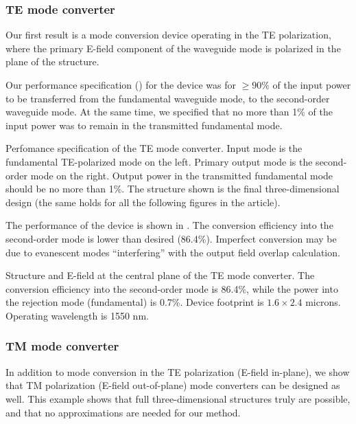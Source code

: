 \subsubsection{TE mode converter}
Our first result is a mode conversion device operating in the TE polarization,
    where the primary E-field component
    of the waveguide mode is polarized in the plane of the structure.

Our performance specification () 
    for the device was for $\ge90\%$ of the 
    input power to be transferred from the fundamental waveguide mode,
    to the second-order waveguide mode.
At the same time, we specified that no more than 1\% of the input power
    was to remain in the transmitted fundamental mode.

    {Perfomance specification of the TE mode converter.
    Input mode is the fundamental TE-polarized mode on the left.
    Primary output mode is the second-order mode on the right.
    Output power in the transmitted fundamental mode 
    should be no more than 1\%.
    The structure shown is the final three-dimensional design
    (the same holds for all the following figures in the article).
    }

The performance of the device is shown in .
The conversion efficiency into the second-order mode is lower
    than desired (86.4\%). 
Imperfect conversion may be due to evanescent modes ``interfering'' 
    with the output field overlap calculation.

    {Structure and E-field at the central plane of the TE mode converter.
    The conversion efficiency into the second-order mode is 86.4\%,
    while the power into the rejection mode (fundamental) is 0.7\%.
    Device footprint is $1.6\times2.4$ microns.
    Operating wavelength is 1550 nm.}


\subsubsection{TM mode converter}

In addition to mode conversion in the TE polarization (E-field in-plane),
    we show that TM polarization (E-field out-of-plane) mode converters
    can be designed as well.
This example shows that full three-dimensional structures 
    truly are possible,
    and that no approximations are needed for our method.

